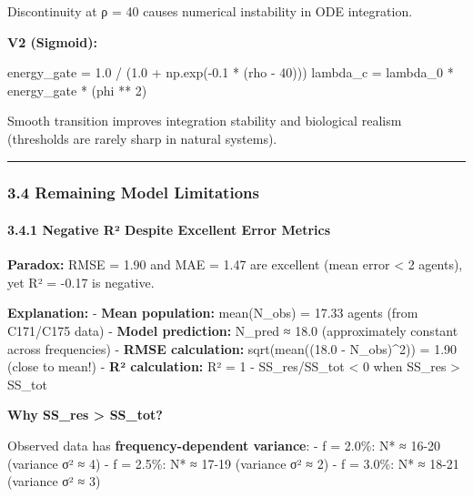 \documentclass[
]{article}
\newenvironment{Shaded}{}{}
\newcommand{\DecValTok}[1]{\textcolor[rgb]{0.25,0.63,0.44}{#1}}
\newcommand{\FloatTok}[1]{\textcolor[rgb]{0.25,0.63,0.44}{#1}}
\newcommand{\NormalTok}[1]{#1}
\newcommand{\OperatorTok}[1]{\textcolor[rgb]{0.40,0.40,0.40}{#1}}
\begin{document}
Discontinuity at ρ = 40 causes numerical instability in ODE integration.

\textbf{V2 (Sigmoid):}

\begin{Shaded}
\begin{Highlighting}[]
\NormalTok{energy\_gate }\OperatorTok{=} \FloatTok{1.0} \OperatorTok{/}\NormalTok{ (}\FloatTok{1.0} \OperatorTok{+}\NormalTok{ np.exp(}\OperatorTok{{-}}\FloatTok{0.1} \OperatorTok{*}\NormalTok{ (rho }\OperatorTok{{-}} \DecValTok{40}\NormalTok{)))}
\NormalTok{lambda\_c }\OperatorTok{=}\NormalTok{ lambda\_0 }\OperatorTok{*}\NormalTok{ energy\_gate }\OperatorTok{*}\NormalTok{ (phi }\OperatorTok{**} \DecValTok{2}\NormalTok{)}
\end{Highlighting}
\end{Shaded}

Smooth transition improves integration stability and biological realism
(thresholds are rarely sharp in natural systems).

\begin{center}\rule{0.5\linewidth}{0.5pt}\end{center}

\subsubsection{3.4 Remaining Model
Limitations}\label{remaining-model-limitations}

\paragraph{3.4.1 Negative R² Despite Excellent Error
Metrics}\label{negative-ruxb2-despite-excellent-error-metrics}

\textbf{Paradox:} RMSE = 1.90 and MAE = 1.47 are excellent (mean error
\textless{} 2 agents), yet R² = -0.17 is negative.

\textbf{Explanation:} - \textbf{Mean population:} mean(N\_obs) = 17.33
agents (from C171/C175 data) - \textbf{Model prediction:} N\_pred ≈ 18.0
(approximately constant across frequencies) - \textbf{RMSE calculation:}
sqrt(mean((18.0 - N\_obs)\^{}2)) = 1.90 (close to mean!) - \textbf{R²
calculation:} R² = 1 - SS\_res/SS\_tot \textless{} 0 when SS\_res
\textgreater{} SS\_tot

\textbf{Why SS\_res \textgreater{} SS\_tot?}

Observed data has \textbf{frequency-dependent variance}: - f = 2.0\%: N*
≈ 16-20 (variance σ² ≈ 4) - f = 2.5\%: N* ≈ 17-19 (variance σ² ≈ 2) - f
= 3.0\%: N* ≈ 18-21 (variance σ² ≈ 3)
\end{document}
